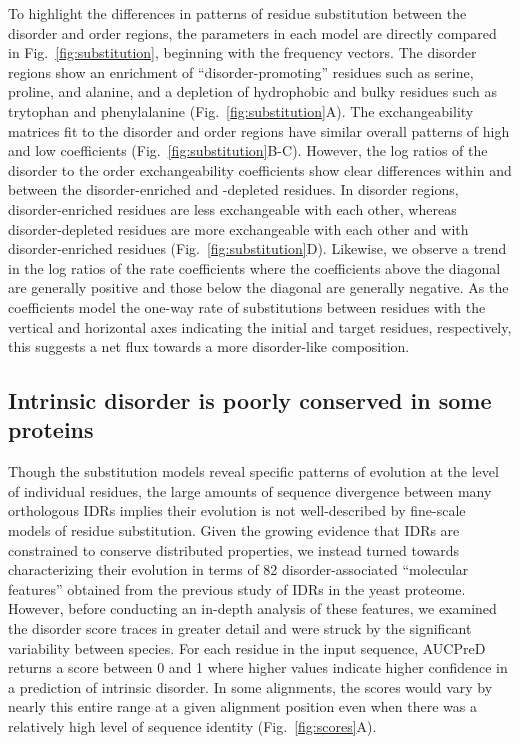 To highlight the differences in patterns of residue substitution between the disorder and order regions, the parameters in each model are directly compared in Fig.~\ref{fig:substitution}, beginning with the frequency vectors. The disorder regions show an enrichment of ``disorder-promoting'' residues such as serine, proline, and alanine, and a depletion of hydrophobic and bulky residues such as trytophan and phenylalanine (Fig.~\ref{fig:substitution}A). The exchangeability matrices fit to the disorder and order regions have similar overall patterns of high and low coefficients (Fig.~\ref{fig:substitution}B-C). However, the log ratios of the disorder to the order exchangeability coefficients show clear differences within and between the disorder-enriched and -depleted residues. In disorder regions, disorder-enriched residues are less exchangeable with each other, whereas disorder-depleted residues are more exchangeable with each other and with disorder-enriched residues (Fig.~\ref{fig:substitution}D). Likewise, we observe a trend in the log ratios of the rate coefficients where the coefficients above the diagonal are generally positive and those below the diagonal are generally negative. As the coefficients model the one-way rate of substitutions between residues with the vertical and horizontal axes indicating the initial and target residues, respectively, this suggests a net flux towards a more disorder-like composition.

\subsection{Intrinsic disorder is poorly conserved in some proteins}
Though the substitution models reveal specific patterns of evolution at the level of individual residues, the large amounts of sequence divergence between many orthologous IDRs implies their evolution is not well-described by fine-scale models of residue substitution. Given the growing evidence that IDRs are constrained to conserve distributed properties, we instead turned towards characterizing their evolution in terms of 82 disorder-associated ``molecular features'' obtained from the previous study of IDRs in the yeast proteome. However, before conducting an in-depth analysis of these features, we examined the disorder score traces in greater detail and were struck by the significant variability between species. For each residue in the input sequence, AUCPreD returns a score between 0 and 1 where higher values indicate higher confidence in a prediction of intrinsic disorder. In some alignments, the scores would vary by nearly this entire range at a given alignment position even when there was a relatively high level of sequence identity (Fig.~\ref{fig:scores}A).

